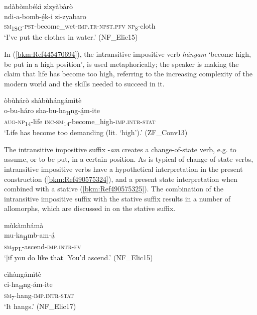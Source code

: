 \ea
\label{bkm:Ref452481814}
ndàbòmbékì zìzyàbàrò\\
\gll ndi-a-bomb-é̲k-i          zi-zyabaro\\
\textsc{sm}\textsubscript{1SG}-\textsc{pst}-become\_wet-\textsc{imp}.\textsc{tr}-\textsc{npst}.\textsc{pfv}  \textsc{np}\textsubscript{8}-cloth\\
\glt ‘I’ve put the clothes in water.’ (NF\_Elic15)
\z

In (\ref{bkm:Ref445470694}), the intransitive impositive verb \textit{hángam} ‘become high, be put in a high position’, is used metaphorically; the speaker is making the claim that life has become too high, referring to the increasing complexity of the modern world and the skills needed to succeed in it.

\newpage
\ea
\label{bkm:Ref445470694}
òbùhárò shàbùhángámìtè\\
\gll o-bu-háro    sha-bu-ha\textsubscript{H}ng-á̲m-ite\\
\textsc{aug}-\textsc{np}\textsubscript{14}-life  \textsc{inc}-\textsc{sm}\textsubscript{14}-become\_high-\textsc{imp}.\textsc{intr}-\textsc{stat}\\
\glt ‘Life has become too demanding (lit. ‘high’).’ (ZF\_Conv13)
\z

The intransitive impositive suffix -\textit{am} creates a change-of-state verb, e.g. to assume, or to be put, in a certain position. As is typical of change-of-state verbs, intransitive impositive verbs have a hypothetical interpretation in the present construction (\ref{bkm:Ref490575324}), and a present state interpretation when combined with a stative (\ref{bkm:Ref490575325}). The combination of the intransitive impositive suffix with the stative suffix results in a number of allomorphs, which are discussed in  on the stative suffix.

\ea
\label{bkm:Ref490575324}
\glll mùkàmbámà\\
mu-ka\textsubscript{H}mb-am-á̲\\
\textsc{sm}\textsubscript{2PL}-ascend-\textsc{imp}.\textsc{intr}-\textsc{fv}\\
\glt ‘[if you do like that] You’d ascend.’ (NF\_Elic15)
\z

\ea
\label{bkm:Ref490575325}
\glll cìhàngámìtè\\
ci-ha\textsubscript{H}ng-ám-ite\\
\textsc{sm}\textsubscript{7}-hang-\textsc{imp}.\textsc{intr}-\textsc{stat}\\
\glt ‘It hangs.’ (NF\_Elic17)
\z

